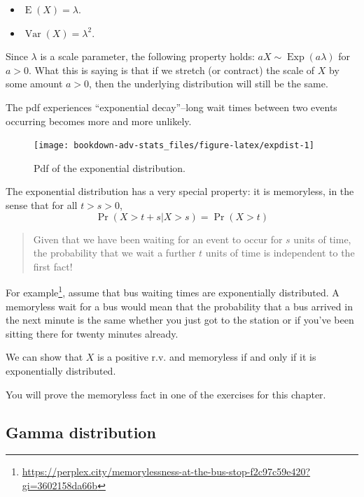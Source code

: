 \documentclass[
]{book}
\providecommand{\tightlist}{%
  \setlength{\itemsep}{0pt}\setlength{\parskip}{0pt}}
\DeclareMathOperator{\E}{E}
\DeclareMathOperator{\Var}{Var}
\DeclareMathOperator{\Exp}{Exp}
\theoremstyle{definition}
\theoremstyle{definition}
\theoremstyle{definition}
\theoremstyle{definition}
\theoremstyle{remark}
\begin{document}
\begin{itemize}
\tightlist
\item
  \(\E(X)=\lambda\).
\item
  \(\Var(X)=\lambda^2\).
\end{itemize}

Since \(\lambda\) is a scale parameter, the following property holds: \(aX\sim\Exp(a\lambda)\) for \(a>0\).
What this is saying is that if we stretch (or contract) the scale of \(X\) by some amount \(a>0\), then the underlying distribution will still be the same.

The pdf experiences ``exponential decay''--long wait times between two events occurring becomes more and more unlikely.

\begin{figure}

{\centering \texttt{[image: bookdown-adv-stats\_files/figure-latex/expdist-1]} 

}

\caption{Pdf of the exponential distribution.}\label{fig:expdist}
\end{figure}

The exponential distribution has a very special property: it is
memoryless, in the sense that for all \(t>s>0\),
\[
\Pr(X > t+s|X>s) = \Pr(X > t)
\]

\begin{quote}
Given that we have been waiting for an event to occur for \(s\) units of time, the probability that we wait a further \(t\) units of time is independent to the first fact!
\end{quote}

For example\footnote{\footnotetext\url{https://perplex.city/memorylessness-at-the-bus-stop-f2c97c59e420?gi=3602158da66b}}, assume that bus waiting times are exponentially distributed. A memoryless wait for a bus would mean that the probability that a bus arrived in the next minute is the same whether you just got to the station or if you've been sitting there for twenty minutes already.

We can show that \(X\) is a positive r.v. and memoryless if and only if it is exponentially distributed.

You will prove the memoryless fact in one of the exercises for this chapter.

\hypertarget{gamma-distribution}{%
\subsection{Gamma distribution}\label{gamma-distribution}}
\end{document}

